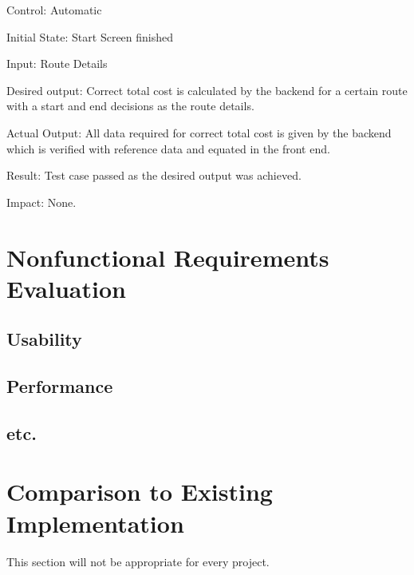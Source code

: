 \documentclass[12pt, titlepage]{article}
\begin{document}
\begin{enumerate}
Control: Automatic
					
Initial State: Start Screen finished
					
Input: Route Details

Desired output: Correct total cost is calculated by the backend for a certain route with a start and end decisions as the route details.

Actual Output: All data required for correct total cost is given by the backend which is verified with reference data and equated in the front end.

Result: Test case passed as the desired output was achieved.

Impact: None.

\end{enumerate}

\section{Nonfunctional Requirements Evaluation}

\subsection{Usability}
		
\subsection{Performance}

\subsection{etc.}
	
\section{Comparison to Existing Implementation}

This section will not be appropriate for every project.

\newpage
\end{document}
